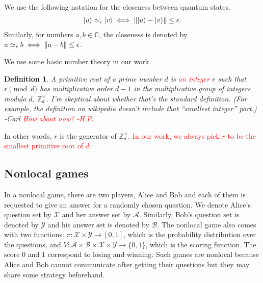 \documentclass[11pt,letterpaper]{article}
\newcommand{\ket}[1]{|#1\rangle}
\newcommand{\ketbra}[2]{|#1\rangle\langle#2|}
\DeclarePairedDelimiter{\norm}{\lVert}{\rVert}
\newcommand{\C}{\mathbb{C}}
\newcommand{\Z}{\mathbb{Z}}
\newcommand{\calX}{\mathcal{X}}
\newcommand{\calY}{\mathcal{Y}}
\newcommand{\calA}{\mathcal{A}}
\newcommand{\calB}{\mathcal{B}}
\newcommand{\Zd}{\Z_d^{\times}}
\newcommand{\1}{\mathbb{1}}
\newcommand{\EPR}[1]{\Sigma^{(#1)}}
\newcommand{\appd}[1]{\simeq_{#1}}
\def\carl#1{{\color{blue} #1 -Carl}}
\newcommand{\hf}[1]{\textcolor{red}{#1}}
\newcommand{\hfc}[1]{\textcolor{red}{#1 -H.F.}}
\newtheorem{definition}[theorem]{Definition}
\theoremstyle{definition}
\begin{document}
We use the following notation for the closeness between quantum states.
\begin{align}
	\ket{u} \appd{\epsilon} \ket{v} \iff \norm{\ket{u} - \ket{v}} \leq \epsilon. 
\end{align}
Similarly, for numbers $a,b \in \C$, the closeness is denoted by
$a \appd{\epsilon} b \iff \norm{a-b} \leq \epsilon$.

We use some basic number theory in our work. 
\begin{definition}
A primitive root of a prime number
$d$ is \hf{an integer} $r$ such that $r \pmod{d}$ has multiplicative order $d-1$
in the multiplicative group of integers modulo $d$, $\Zd$.  \carl{I'm skeptical about whether that's the standard definition.  (For example, the definition on wikipedia doesn't include that ``smallest integer'' part.)}
\hfc{How about now?}
\end{definition}
In other words,
$r$ is the generator of $\Zd$.
\hf{In our work, we always pick $r$ to be the smallest primitive root of $d$.}



\subsection{Nonlocal games}
In a nonlocal game, there are two players, Alice and Bob and each of them is requested
to give an answer for a randomly chosen question. We denote Alice's question set by $\calX$ and her answer set by $\calA$. Similarly,
Bob's question set is denoted by $\calY$ and his answer set is denoted by $\calB$. The nonlocal game also
comes with two functions: $\pi: \calX \times \calY \rightarrow [0,1]$, which is the probability distribution over the questions,
and $V: \calA \times \calB \times \calX \times \calY \rightarrow \{0,1\}$, which is the scoring function. 
The score $0$ and $1$ correspond to losing and winning. 
Such games are nonlocal
because Alice and Bob cannot communicate after getting their questions but they may share some strategy beforehand. 
\end{document}
